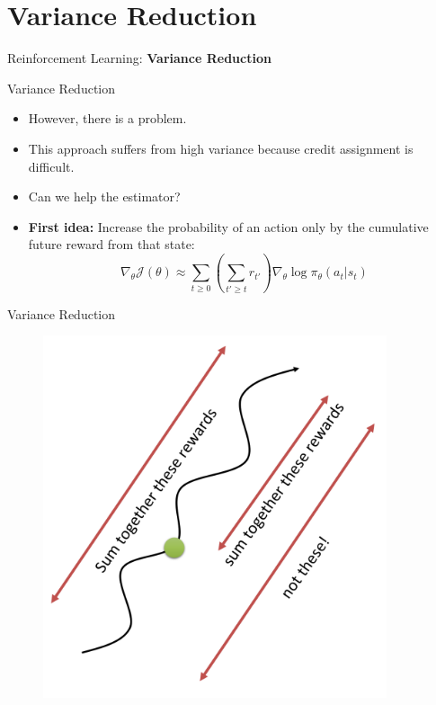\section{Variance Reduction}
\begin{frame}{}
    \LARGE Reinforcement Learning: \textbf{Variance Reduction}
\end{frame}

\begin{frame}{Variance Reduction}
\begin{itemize}
    \item However, there is a problem.
    \item This approach suffers from high variance because credit assignment is difficult.
    \item Can we help the estimator?
    \pause
    \item \textbf{First idea:} Increase the probability of an action only by the cumulative future reward from that state:
    $$\nabla_\theta \mathcal{J}(\theta) \approx \sum_{t \geq 0} \left( \sum_{t' \geq t} r_{t'} \right ) \nabla_\theta \log \pi_\theta (a_t|s_t) $$
\end{itemize}
\end{frame}

\begin{frame}{Variance Reduction}
\begin{figure}
\centering
\includegraphics[width=0.9\textwidth,height=0.9\textheight,keepaspectratio]{images/policygrad+reinforce+actor/var_red_1.png}
\end{figure}
\end{frame}

